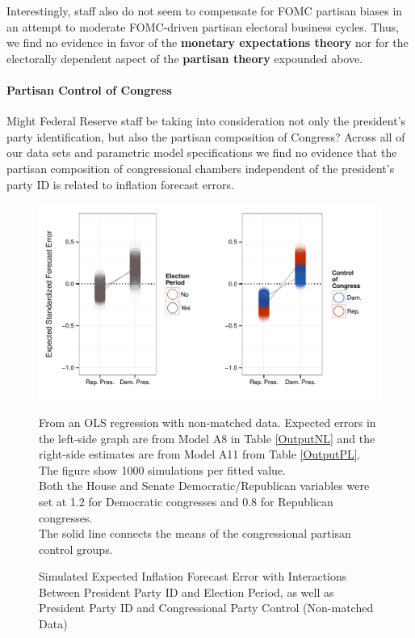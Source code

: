 \documentclass[a4paper]{article}\usepackage{graphicx, color}
\newenvironment{knitrout}{}{} %
\begin{document}
Interestingly, staff also do not seem to compensate for FOMC partisan biases in an attempt to moderate FOMC-driven partisan electoral business cycles. Thus, we find no evidence in favor of the {\bf{monetary expectations theory}} nor for the electorally dependent aspect of the {\bf{partisan theory}} expounded above.

\paragraph{Partisan Control of Congress}

Might Federal Reserve staff be taking into consideration not only the president's party identification, but also the partisan composition of Congress?  Across all of our data sets and parametric model specifications we find no evidence that the partisan composition of congressional chambers independent of the president's party ID is related to inflation forecast errors. 

\begin{figure}[t]
    \caption{Simulated Expected Inflation Forecast Error with Interactions Between President Party ID and Election Period, as well as President Party ID and Congressional Party Control (Non-matched Data)}
    \label{InterPlot}
    \begin{center}

\begin{knitrout}
\color{fgcolor}\includegraphics[width=0.95\linewidth]{figure/InterPlot} 
\end{knitrout}


    \end{center}
    \begin{singlespace}
        {\scriptsize{From an OLS regression with non-matched data. Expected errors in the left-side graph are from Model A8 in Table \ref{OutputNL} and the right-side estimates are from Model A11 from Table \ref{OutputPL}. The figure show 1000 simulations per fitted value. \\ Both the House and Senate Democratic/Republican variables were set at 1.2 for Democratic congresses and 0.8 for Republican congresses. \\ The solid line connects the means of the congressional partisan control groups.}}
    \end{singlespace}
\end{figure}
\end{document}

